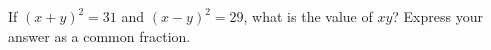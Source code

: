 If $(x+y)^2=31$ and $(x-y)^2=29$, what is the value of $xy$? Express your answer as a common fraction.
